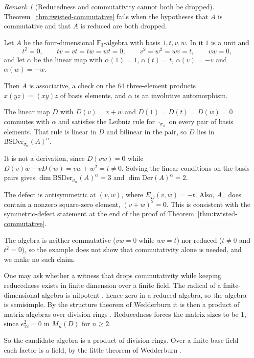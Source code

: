 \documentclass[]{interact}
\theoremstyle{plain}
\theoremstyle{definition}
\theoremstyle{remark}
\newtheorem{remark}[theorem]{Remark}
\newcommand{\Der}{\mathrm{Der}}
\newcommand{\BSDer}{\mathrm{BSDer}}
\begin{document}
\begin{remark}[Reducedness and commutativity cannot both be dropped]\label{rem:commutativity-needed}
Theorem~\ref{thm:twisted-commutative} fails when the hypotheses that $A$ is commutative and that $A$ is reduced are both dropped.

Let $A$ be the four-dimensional $\mathbb{F}_3$-algebra with basis $1, t, v, w$. In it $1$ is a unit and
\[
t^2 = 0, \qquad tv = vt = tw = wt = 0, \qquad v^2 = w^2 = wv = t, \qquad vw = 0,
\]
and let $\alpha$ be the linear map with $\alpha(1) = 1$, $\alpha(t) = t$, $\alpha(v) = -v$ and $\alpha(w) = -w$.

Then $A$ is associative, a check on the $64$ three-element products $x(yz) = (xy)z$ of basis elements, and $\alpha$ is an involutive automorphism.

The linear map $D$ with $D(v) = v + w$ and $D(1) = D(t) = D(w) = 0$ commutes with $\alpha$ and satisfies the Leibniz rule for $\cdot_{\sigma_\alpha}$ on every pair of basis elements. That rule is linear in $D$ and bilinear in the pair, so $D$ lies in $\BSDer_{\sigma_\alpha}(A)^\alpha$.

It is not a derivation, since $D(vw) = 0$ while $D(v)w + vD(w) = vw + w^2 = t \neq 0$.
Solving the linear conditions on the basis pairs gives $\dim \BSDer_{\sigma_\alpha}(A)^\alpha = 3$ and $\dim \Der(A)^\alpha = 2$.

The defect is antisymmetric at $(v,w)$, where $E_D(v,w) = -t$. Also, $A_-$ does contain a nonzero square-zero element, $(v+w)^2 = 0$. This is consistent with the symmetric-defect statement at the end of the proof of Theorem~\ref{thm:twisted-commutative}.

The algebra is neither commutative ($vw = 0$ while $wv = t$) nor reduced ($t \ne 0$ and $t^2 = 0$), so the example does not show that commutativity alone is needed, and we make no such claim.

One may ask whether a witness that drops commutativity while keeping reducedness exists in finite dimension over a finite field. %
The radical of a finite-dimensional algebra is nilpotent \citep[\S4.4]{Pierce1982}, hence zero in a reduced algebra, so the algebra is semisimple.
By the structure theorem of Wedderburn it is then a product of matrix algebras over division rings \citep[\S3.5]{Pierce1982}. Reducedness forces the matrix sizes to be $1$, since $e_{12}^2 = 0$ in $M_n(D)$ for $n \geq 2$.

So the candidate algebra is a product of division rings. Over a finite base field each factor is a field, by the little theorem of Wedderburn \citep[Exercise 4.9.19]{ChambertLoir2021}.


\end{remark}
\end{document}
